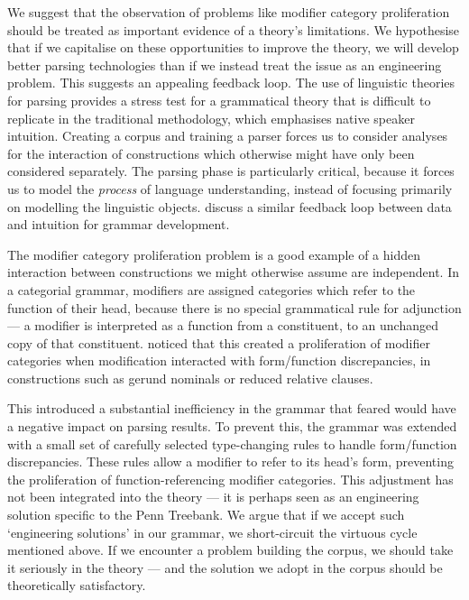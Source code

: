 We suggest that the observation of problems like modifier category
proliferation should be treated as important evidence of a
theory's limitations. We hypothesise that if we capitalise on these
opportunities to improve the theory, we will develop better parsing technologies
than if we instead treat the issue as an engineering problem. This suggests an
appealing feedback loop. The use of linguistic theories
for parsing provides a stress test for a grammatical theory that is difficult to
replicate in the traditional methodology, which emphasises native speaker
intuition. Creating a corpus and training a parser forces us to consider
analyses for the interaction of constructions which otherwise might have only
been considered separately. The parsing phase is particularly critical, because
it forces us to model the \emph{process} of language understanding, instead of
focusing primarily on modelling the linguistic objects.
\citet{baldwin:05} discuss a similar feedback loop between data and intuition for
grammar development.

The modifier category proliferation problem is a good example of a hidden interaction
between constructions we might otherwise assume are independent. In a categorial
grammar, modifiers are assigned categories which refer to the function of their
head, because there is no special grammatical rule for adjunction --- a modifier
is interpreted as a function from a constituent, to an unchanged copy of that
constituent. \citeauthor{hock:lrec02} noticed that this created a proliferation of
modifier categories when modification interacted with form/function discrepancies,
in constructions such as gerund nominals or
reduced relative clauses.

This introduced a substantial inefficiency in the grammar that
\citet{hock:lrec02} feared would have a negative impact on parsing results.
To prevent this, the grammar was extended with a small set of carefully selected
type-changing rules to handle form/function discrepancies. These rules allow
a modifier to refer to its head's form, preventing the proliferation of
function-referencing modifier categories. This adjustment has not been
integrated into the \ccg theory --- it is perhaps seen as an engineering
solution specific to the Penn Treebank. We argue that
if we accept such `engineering solutions' in our grammar, we short-circuit the virtuous
cycle mentioned above. If we encounter a problem building the corpus, we should
take it seriously in the theory --- and the solution we adopt in the corpus
should be theoretically satisfactory.

